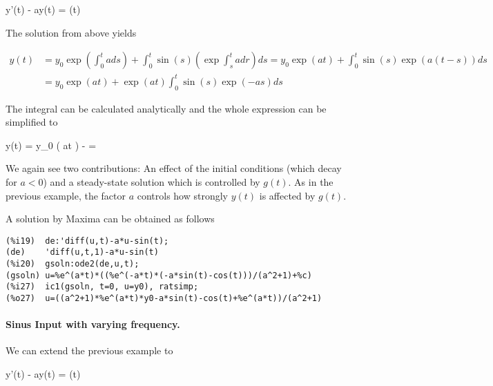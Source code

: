 \bee
y'(t) - ay(t) = \sin(t)
\eee

The solution from above yields

\begin{align*}
y(t) &= y_0 \exp \left( \int_0^t a ds \right) + \int_0^t \sin(s) \left( \exp \int_s^t a dr \right) ds = y_0 \exp \left( at \right) + \int_0^t \sin(s) \exp \left( a(t-s) \right) ds \\
&= y_0 \exp \left( at \right) + \exp(at) \int_0^t \sin(s) \exp (-as) ds
\end{align*}

The integral can be calculated analytically and the whole expression can be simplified to

\bee
y(t) = y_0 \exp \left( at \right) -  =  
\eee

We again see two contributions: An effect of the initial conditions (which decay for $a < 0$) and a steady-state solution which is controlled by $g(t)$. As in the previous example, the factor $a$ controls how strongly $y(t)$ is affected by $g(t)$.


A solution by Maxima can be obtained as follows

\begin{verbatim}
(%i19)	de:'diff(u,t)-a*u-sin(t);
(de)	'diff(u,t,1)-a*u-sin(t)
(%i20)	gsoln:ode2(de,u,t);
(gsoln)	u=%e^(a*t)*((%e^(-a*t)*(-a*sin(t)-cos(t)))/(a^2+1)+%c)
(%i27)	ic1(gsoln, t=0, u=y0), ratsimp;
(%o27)	u=((a^2+1)*%e^(a*t)*y0-a*sin(t)-cos(t)+%e^(a*t))/(a^2+1)
\end{verbatim}


\paragraph{Sinus Input with varying frequency.} We can extend the previous example to

\bee
y'(t) - ay(t) = \sin(\omega t)
\eee

